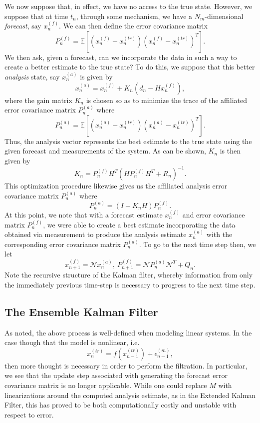 We now suppose that, in effect, we have no access to the true state.  However, we suppose that at time $t_{n}$, through some mechanism, we have a $N_{m}$-dimensional {\it forecast}, say $x^{(f)}_{n}$.  We can then define the error covariance matrix 
\[
P^{(f)}_{n} = \mathbb{E}\left[\left(x^{(f)}_{n} - x^{(tr)}_{n}\right)\left(x^{(f)}_{n} - x^{(tr)}_{n}\right)^{T} \right].
\]
We then ask, given a forecast, can we incorporate the data in such a way to create a better estimate to the true state?  To do this, we suppose that this better {\it analysis} state, say $x^{(a)}_{n}$ is given by 
\[
x^{(a)}_{n} = x^{(f)}_{n} + K_{n}(d_{n} - Hx^{(f)}_{n}),
\]
where the gain matrix $K_{n}$ is chosen so as to minimize the trace of the affiliated error covariance matrix $P^{(a)}_{n}$ where
\[
P^{(a)}_{n} = \mathbb{E}\left[\left(x^{(a)}_{n} - x^{(tr)}_{n}\right)\left(x^{(a)}_{n} - x^{(tr)}_{n}\right)^{T} \right].
\]
Thus, the analysis vector represents the best estimate to the true state using the given forecast and measurements of the system.  As can be shown, $K_{n}$ is then given by 
\[
K_{n} = P^{(f)}_{n}H^{T}\left(HP^{(f)}_{n}H^{T} + R_{n} \right)^{-1}.
\]
This optimization procedure likewise gives us the affiliated analysis error covariance matrix $P^{(a)}_{n}$ where
\[
P^{(a)}_{n} = (I-K_{n}H)P^{(f)}_{n}.
\]
At this point, we note that with a forecast estimate $x^{(f)}_{n}$ and error covariance matrix $P^{(f)}_{n}$, we were able to create a best estimate incorporating the data obtained via measurement to produce the analysis estimate $x^{(a)}_{n}$ with the corresponding error covariance matrix $P^{(a)}_{n}$.  To go to the next time step then, we let
\[
x^{(f)}_{n+1} = \mathcal{N}x^{(a)}_{n}, ~ P_{n+1}^{(f)} = \mathcal{N}P^{(a)}_{n}\mathcal{N}^{T} + Q_{n}.
\]
Note the recursive structure of the Kalman filter, whereby information from only the immediately previous time-step is necessary to progress to the next time step.  

\subsection*{The Ensemble Kalman Filter}
As noted, the above process is well-defined when modeling linear systems.  In the case though that the model is nonlinear, i.e.
\[
x^{(tr)}_{n} = f\left(x^{(tr)}_{n-1}\right) + \epsilon^{(m)}_{n-1},
\]
then more thought is necessary in order to perform the filtration.  In particular, we see that the update step associated with generating the forecast error covariance matrix is no longer applicable.  While one could replace $M$ with linearizations around the computed analysis estimate, as in the Extended Kalman Filter, this has proved to be both computationally costly and unstable with respect to error.  

